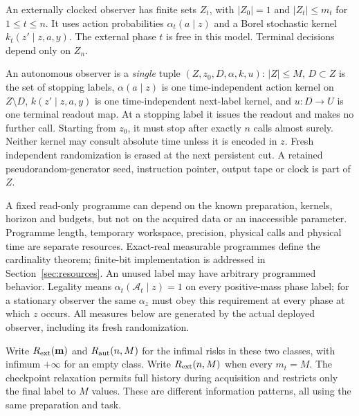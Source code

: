 \begin{definition}\label{def:machines}
An externally clocked observer has finite sets $Z_t$, with $|Z_0|=1$ and $|Z_t|\le m_t$ for $1\le t\le n$. It uses action probabilities $\alpha_t(a\mid z)$ and a Borel stochastic kernel $k_t(z'\mid z,a,y)$. The external phase $t$ is free in this model. Terminal decisions depend only on $Z_n$.

An autonomous observer is a \emph{single} tuple $(Z,z_0,D,\alpha,k,u)$: $|Z|\le M$, $D\subset Z$ is the set of stopping labels, $\alpha(a\mid z)$ is one time-independent action kernel on $Z\setminus D$, $k(z'\mid z,a,y)$ is one time-independent next-label kernel, and $u:D\to U$ is one terminal readout map. At a stopping label it issues the readout and makes no further call. Starting from $z_0$, it must stop after exactly $n$ calls almost surely. Neither kernel may consult absolute time unless it is encoded in $z$. Fresh independent randomization is erased at the next persistent cut. A retained pseudorandom-generator seed, instruction pointer, output tape or clock is part of $Z$.
\end{definition}
A fixed read-only programme can depend on the known preparation, kernels, horizon and budgets, but not on the acquired data or an inaccessible parameter. Programme length, temporary workspace, precision, physical calls and physical time are separate resources. Exact-real measurable programmes define the cardinality theorem; finite-bit implementation is addressed in Section~\ref{sec:resources}. An unused label may have arbitrary programmed behavior. Legality means $\alpha_t(\mathcal A_t\mid z)=1$ on every positive-mass phase label; for a stationary observer the same $\alpha_z$ must obey this requirement at every phase at which $z$ occurs. All measures below are generated by the actual deployed observer, including its fresh randomization.

Write $R_{\mathrm{ext}}(\mathbf m)$ and $R_{\mathrm{aut}}(n,M)$ for the infimal risks in these two classes, with infimum $+\infty$ for an empty class. Write $R_{\mathrm{ext}}(n,M)$ when every $m_t=M$. The checkpoint relaxation permits full history during acquisition and restricts only the final label to $M$ values. These are different information patterns, all using the same preparation and task.
